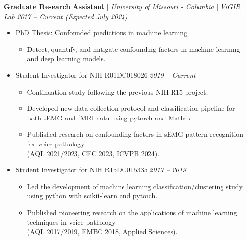 \documentclass[letterpaper,10pt]{article}
\begin{document}
\textbf{Graduate Research Assistant} $|$
\emph{University of Missouri - Columbia} $|$
\emph{ViGIR Lab} \hfill
\emph{2017 -- Current (Expected July 2024)}
\begin{itemize}[leftmargin=0.15in, parsep=0pt] 
  \item PhD Thesis: Confounded predictions in machine learning
  \begin{itemize}[leftmargin=0.15in, parsep=0pt] 
    \item Detect, quantify, and mitigate confounding factors in machine learning and deep learning models.
  \end{itemize}
  \item Student Investigator for NIH R01DC018026 \hfill
  \emph{2019 -- Current}
  \begin{itemize}[leftmargin=0.15in, parsep=0pt]
    \item Continuation study following the previous NIH R15 project.
    \item Developed new data collection protocol and classification pipeline for both sEMG and fMRI data using pytorch and Matlab. 
    \item Published research on confounding factors in sEMG pattern recognition for voice pathology\\ (AQL 2021/2023, CEC 2023, ICVPB 2024). 
  \end{itemize}
  \item Student Investigator for NIH R15DC015335 \hfill
  \emph{2017 -- 2019}
  \begin{itemize}[leftmargin=0.15in, parsep=0pt]
    \item Led the development of machine learning classification/clustering study using python with scikit-learn and pytorch.
    \item Published pioneering research on the applications of machine learning techniques in voice pathology\\ (AQL 2017/2019, EMBC 2018, Applied Sciences).
  \end{itemize}
\end{itemize}
\end{document}
